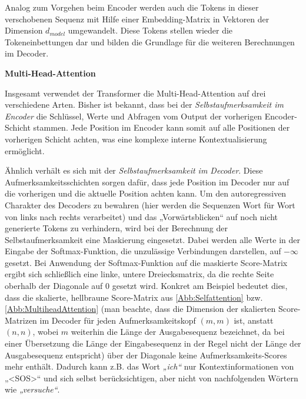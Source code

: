 Analog zum Vorgehen beim Encoder werden auch die Tokens in dieser verschobenen Sequenz mit Hilfe einer Embedding-Matrix in Vektoren der Dimension $d_{model}$ umgewandelt. Diese Tokens stellen wieder die Tokeneinbettungen dar und bilden die Grundlage für die weiteren Berechnungen im Decoder.

\textbf{Multi-Head-Attention}

Insgesamt verwendet der Transformer die Multi-Head-Attention auf drei verschiedene Arten. Bisher ist bekannt, dass bei der \emph{Selbstaufmerksamkeit im Encoder} die Schlüssel, Werte und Abfragen vom Output der vorherigen Encoder-Schicht stammen. Jede Position im Encoder kann somit auf alle Positionen der vorherigen Schicht achten, was eine komplexe interne Kontextualisierung ermöglicht.

Ähnlich verhält es sich mit der \emph{Selbstaufmerksamkeit im Decoder}. Diese Aufmerksamkeitsschichten sorgen dafür, dass jede Position im Decoder nur auf die vorherigen und die aktuelle Position achten kann. Um den autoregressiven Charakter des Decoders zu bewahren (hier werden die Sequenzen Wort für Wort von links nach rechts verarbeitet) und das „Vorwärtsblicken“ auf noch nicht generierte Tokens zu verhindern, wird bei der Berechnung der Selbstaufmerksamkeit eine Maskierung eingesetzt. Dabei werden alle Werte in der Eingabe der Softmax-Funktion, die unzulässige Verbindungen darstellen, auf $-\infty$ gesetzt. Bei Anwendung der Softmax-Funktion auf die maskierte Score-Matrix ergibt sich schließlich eine linke, untere Dreiecksmatrix, da die rechte Seite oberhalb der Diagonale auf 0 gesetzt wird. Konkret am Beispiel bedeutet dies, dass die skalierte, hellbraune Score-Matrix aus \cref{Abb:Selfattention} bzw. \cref{Abb:MultiheadAttention} (man beachte, dass die Dimension der skalierten Score-Matrizen im Decoder für jeden Aufmerksamkeitskopf $(m, m)$ ist, anstatt $(n, n)$, wobei $m$ weiterhin die Länge der Ausgabesequenz bezeichnet, da bei einer Übersetzung die Länge der Eingabesequenz in der Regel nicht der Länge der Ausgabesequenz entspricht) über der Diagonale keine Aufmerksamkeits-Scores mehr enthält. Dadurch kann z.B. das Wort \emph{„ich“} nur Kontextinformationen von „<SOS>“ und sich selbst berücksichtigen, aber nicht von nachfolgenden Wörtern wie \emph{„versuche“}.  

